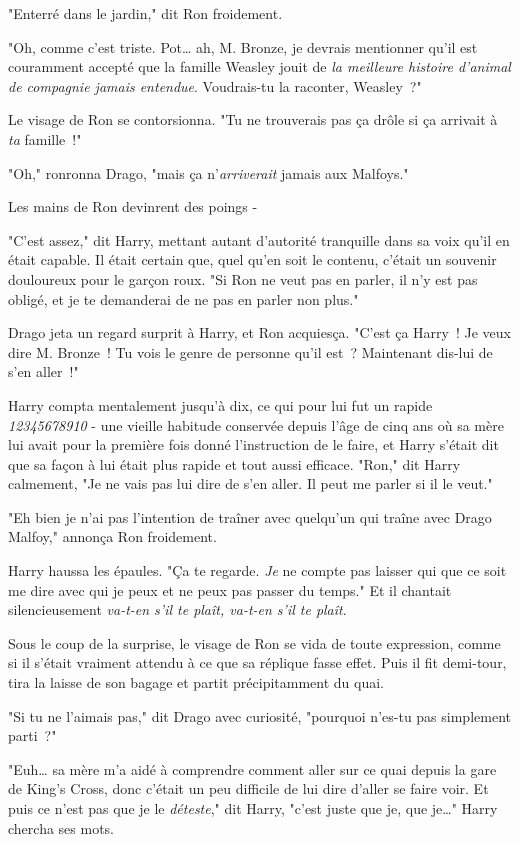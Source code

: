 "Enterré dans le jardin," dit Ron froidement.

"Oh, comme c'est triste. Pot… ah, M. Bronze, je devrais mentionner qu'il est couramment accepté que la famille Weasley jouit de \emph{la meilleure histoire d'animal de compagnie jamais entendue}. Voudrais-tu la raconter, Weasley~?"

Le visage de Ron se contorsionna. "Tu ne trouverais pas ça drôle si ça arrivait à \emph{ta} famille~!"

"Oh," ronronna Drago, "mais ça n'\emph{arriverait} jamais aux Malfoys."

Les mains de Ron devinrent des poings -

"C'est assez," dit Harry, mettant autant d'autorité tranquille dans sa voix qu'il en était capable. Il était certain que, quel qu'en soit le contenu, c'était un souvenir douloureux pour le garçon roux. "Si Ron ne veut pas en parler, il n'y est pas obligé, et je te demanderai de ne pas en parler non plus."

Drago jeta un regard surprit à Harry, et Ron acquiesça. "C'est ça Harry~! Je veux dire M. Bronze~! Tu vois le genre de personne qu'il est~? Maintenant dis-lui de s'en aller~!"

Harry compta mentalement jusqu'à dix, ce qui pour lui fut un rapide \emph{12345678910} - une vieille habitude conservée depuis l'âge de cinq ans où sa mère lui avait pour la première fois donné l'instruction de le faire, et Harry s'était dit que sa façon à lui était plus rapide et tout aussi efficace. "Ron," dit Harry calmement, "Je ne vais pas lui dire de s'en aller. Il peut me parler si il le veut."

"Eh bien je n'ai pas l'intention de traîner avec quelqu'un qui traîne avec Drago Malfoy," annonça Ron froidement.

Harry haussa les épaules. "Ça te regarde. \emph{Je} ne compte pas laisser qui que ce soit me dire avec qui je peux et ne peux pas passer du temps." Et il chantait silencieusement \emph{va-t-en s'il te plaît, va-t-en s'il te plaît}.

Sous le coup de la surprise, le visage de Ron se vida de toute expression, comme si il s'était vraiment attendu à ce que sa réplique fasse effet. Puis il fit demi-tour, tira la laisse de son bagage et partit précipitamment du quai.

"Si tu ne l'aimais pas," dit Drago avec curiosité, "pourquoi n'es-tu pas simplement parti~?"

"Euh… sa mère m'a aidé à comprendre comment aller sur ce quai depuis la gare de King's Cross, donc c'était un peu difficile de lui dire d'aller se faire voir. Et puis ce n'est pas que je le \emph{déteste}," dit Harry, "c'est juste que je, que je…" Harry chercha ses mots.

